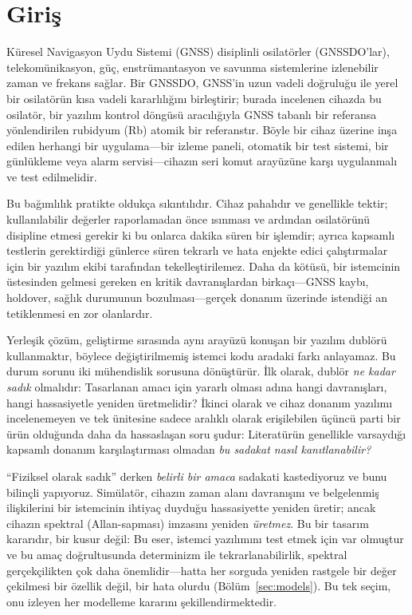 \documentclass[9pt,twocolumn,a4paper]{extarticle}
\begin{document}
\section{Giriş}
Küresel Navigasyon Uydu Sistemi (GNSS) disiplinli osilatörler (GNSSDO'lar), telekomünikasyon, güç, enstrümantasyon ve savunma sistemlerine izlenebilir zaman ve frekans sağlar. Bir GNSSDO, GNSS'in uzun vadeli doğruluğu ile yerel bir osilatörün kısa vadeli kararlılığını birleştirir; burada incelenen cihazda bu osilatör, bir yazılım kontrol döngüsü aracılığıyla GNSS tabanlı bir referansa yönlendirilen rubidyum (Rb) atomik bir referanstır. Böyle bir cihaz üzerine inşa edilen herhangi bir uygulama---bir izleme paneli, otomatik bir test sistemi, bir günlükleme veya alarm servisi---cihazın seri komut arayüzüne karşı uygulanmalı ve test edilmelidir.

Bu bağımlılık pratikte oldukça sıkıntılıdır. Cihaz pahalıdır ve genellikle tektir; kullanılabilir değerler raporlamadan önce ısınması ve ardından osilatörünü disipline etmesi gerekir ki bu onlarca dakika süren bir işlemdir; ayrıca kapsamlı testlerin gerektirdiği günlerce süren tekrarlı ve hata enjekte edici çalıştırmalar için bir yazılım ekibi tarafından tekelleştirilemez. Daha da kötüsü, bir istemcinin üstesinden gelmesi gereken en kritik davranışlardan birkaçı---GNSS kaybı, holdover, sağlık durumunun bozulması---gerçek donanım üzerinde istendiği an tetiklenmesi en zor olanlardır.

Yerleşik çözüm, geliştirme sırasında aynı arayüzü konuşan bir yazılım dublörü kullanmaktır, böylece değiştirilmemiş istemci kodu aradaki farkı anlayamaz. Bu durum sorunu iki mühendislik sorusuna dönüştürür. İlk olarak, dublör \emph{ne kadar sadık} olmalıdır: Tasarlanan amacı için yararlı olması adına hangi davranışları, hangi hassasiyetle yeniden üretmelidir? İkinci olarak ve cihaz donanım yazılımı incelenemeyen ve tek ünitesine sadece aralıklı olarak erişilebilen üçüncü parti bir ürün olduğunda daha da hassaslaşan soru şudur: Literatürün genellikle varsaydığı kapsamlı donanım karşılaştırması olmadan \emph{bu sadakat nasıl kanıtlanabilir?}

``Fiziksel olarak sadık'' derken \emph{belirli bir amaca} sadakati kastediyoruz ve bunu bilinçli yapıyoruz. Simülatör, cihazın zaman alanı davranışını ve belgelenmiş ilişkilerini bir istemcinin ihtiyaç duyduğu hassasiyette yeniden üretir; ancak cihazın spektral (Allan-sapması) imzasını yeniden \emph{üretmez}. Bu bir tasarım kararıdır, bir kusur değil: Bu eser, istemci yazılımını test etmek için var olmuştur ve bu amaç doğrultusunda determinizm ile tekrarlanabilirlik, spektral gerçekçilikten çok daha önemlidir---hatta her sorguda yeniden rastgele bir değer çekilmesi bir özellik değil, bir hata olurdu (Bölüm~\ref{sec:models}). Bu tek seçim, onu izleyen her modelleme kararını şekillendirmektedir.
\end{document}
